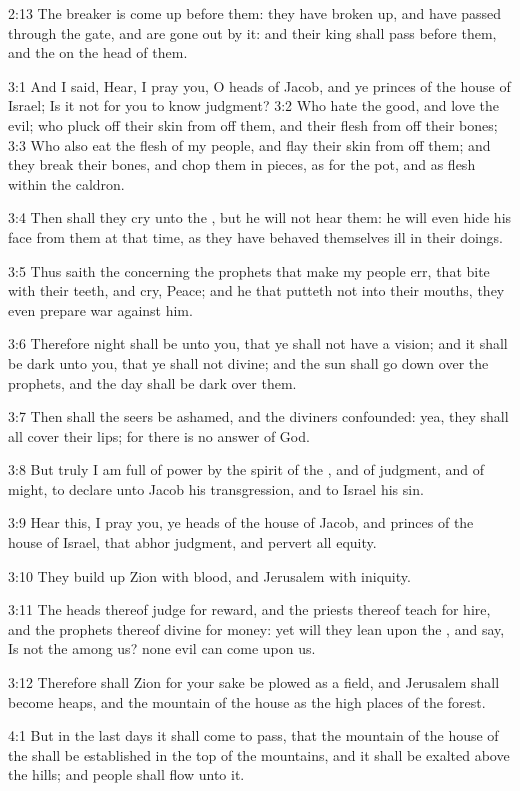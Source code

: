2:13 The breaker is come up before them: they have broken up, and have
passed through the gate, and are gone out by it: and their king shall
pass before them, and the \LORD on the head of them.

3:1 And I said, Hear, I pray you, O heads of Jacob, and ye princes of
the house of Israel; Is it not for you to know judgment?  3:2 Who hate
the good, and love the evil; who pluck off their skin from off them,
and their flesh from off their bones; 3:3 Who also eat the flesh of my
people, and flay their skin from off them; and they break their bones,
and chop them in pieces, as for the pot, and as flesh within the
caldron.

3:4 Then shall they cry unto the \LORD, but he will not hear them: he
will even hide his face from them at that time, as they have behaved
themselves ill in their doings.

3:5 Thus saith the \LORD concerning the prophets that make my people
err, that bite with their teeth, and cry, Peace; and he that putteth
not into their mouths, they even prepare war against him.

3:6 Therefore night shall be unto you, that ye shall not have a
vision; and it shall be dark unto you, that ye shall not divine; and
the sun shall go down over the prophets, and the day shall be dark
over them.

3:7 Then shall the seers be ashamed, and the diviners confounded: yea,
they shall all cover their lips; for there is no answer of God.

3:8 But truly I am full of power by the spirit of the \LORD, and of
judgment, and of might, to declare unto Jacob his transgression, and
to Israel his sin.

3:9 Hear this, I pray you, ye heads of the house of Jacob, and princes
of the house of Israel, that abhor judgment, and pervert all equity.

3:10 They build up Zion with blood, and Jerusalem with iniquity.

3:11 The heads thereof judge for reward, and the priests thereof teach
for hire, and the prophets thereof divine for money: yet will they
lean upon the \LORD, and say, Is not the \LORD among us? none evil can
come upon us.

3:12 Therefore shall Zion for your sake be plowed as a field, and
Jerusalem shall become heaps, and the mountain of the house as the
high places of the forest.

4:1 But in the last days it shall come to pass, that the mountain of
the house of the \LORD shall be established in the top of the
mountains, and it shall be exalted above the hills; and people shall
flow unto it.

